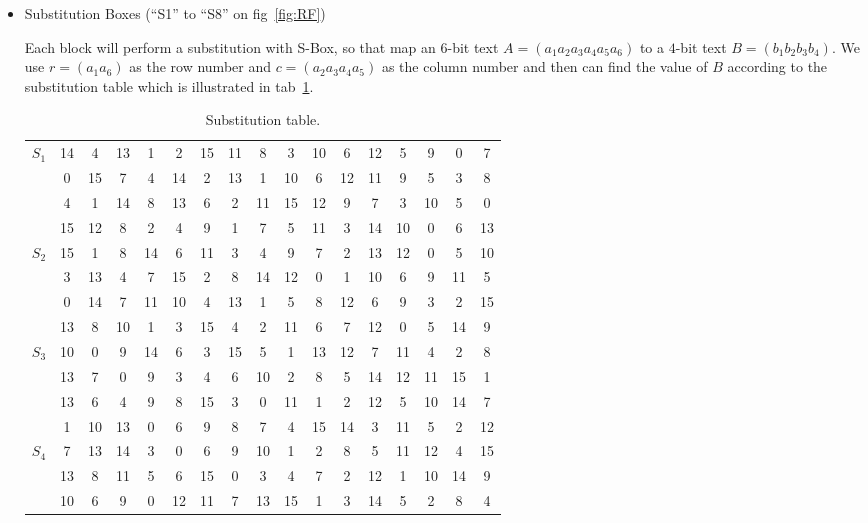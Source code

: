 \documentclass[11pt,a4paper]{article}
\begin{document}
\begin{enumerate}
\begin{itemize}
\begin{itemize}
			\item Substitution Boxes (``S1'' to ``S8'' on fig~\ref{fig:RF})
			\par Each block will perform a substitution with S-Box, so that map an $6$-bit text $A = (a_{1}a_{2}a_{3}a_{4}a_{5}a_{6})$ to a $4$-bit text $B = (b_{1}b_{2}b_{3}b_{4})$. We use $r = (a_{1}a_{6})$ as the row number and $c = (a_{2}a_{3}a_{4}a_{5})$ as the column number and then can find the value of $B$ according to the substitution table which is illustrated in tab~\ref{tab:ST}.
			\begin{table}[!ht]
				\centering
				\caption{Substitution table.}
				\label{tab:ST}
					\begin{tabular}{c|cccccccccccccccc}
						\multirow{4}{*}{$S_1$} & 14 & 4 & 13 & 1 & 2 & 15 & 11 & 8 & 3 & 10 & 6 & 12 & 5 & 9 & 0 & 7 \\
						& 0 & 15 & 7 & 4 & 14 & 2 & 13 & 1 & 10 & 6 & 12 & 11 & 9 & 5 & 3 & 8 \\  
						& 4 & 1 & 14 & 8 & 13 & 6 & 2 & 11 & 15 & 12 & 9 & 7 & 3 & 10 & 5 & 0 \\  
						& 15 & 12 & 8 & 2 & 4 & 9 & 1 & 7 & 5 & 11 & 3 & 14 & 10 & 0 & 6 & 13 \\\hline  
						\multirow{4}{*}{$S_2$} & 15 & 1 & 8 & 14 & 6 & 11 & 3 & 4 & 9 & 7 & 2 & 13 & 12 & 0 & 5 & 10 \\  
						& 3 & 13 & 4 & 7 & 15 & 2 & 8 & 14 & 12 & 0 & 1 & 10 & 6 & 9 & 11 & 5 \\  
						& 0 & 14 & 7 & 11 & 10 & 4 & 13 & 1 & 5 & 8 & 12 & 6 & 9 & 3 & 2 & 15 \\  
						& 13 & 8 & 10 & 1 & 3 & 15 & 4 & 2 & 11 & 6 & 7 & 12 & 0 & 5 & 14 & 9 \\\hline
						\multirow{4}{*}{$S_3$} & 10 & 0 & 9 & 14 & 6 & 3 & 15 & 5 & 1 & 13 & 12 & 7 & 11 & 4 & 2 & 8 \\  
						& 13 & 7 & 0 & 9 & 3 & 4 & 6 & 10 & 2 & 8 & 5 & 14 & 12 & 11 & 15 & 1 \\  
						& 13 & 6 & 4 & 9 & 8 & 15 & 3 & 0 & 11 & 1 & 2 & 12 & 5 & 10 & 14 & 7 \\  
						& 1 & 10 & 13 & 0 & 6 & 9 & 8 & 7 & 4 & 15 & 14 & 3 & 11 & 5 & 2 & 12 \\\hline
						\multirow{4}{*}{$S_4$} & 7 & 13 & 14 & 3 & 0 & 6 & 9 & 10 & 1 & 2 & 8 & 5 & 11 & 12 & 4 & 15 \\  
						& 13 & 8 & 11 & 5 & 6 & 15 & 0 & 3 & 4 & 7 & 2 & 12 & 1 & 10 & 14 & 9 \\  
						& 10 & 6 & 9 & 0 & 12 & 11 & 7 & 13 & 15 & 1 & 3 & 14 & 5 & 2 & 8 & 4 \\  

\end{tabular}
\end{table}
\end{itemize}
\end{itemize}
\end{enumerate}
\end{document}
